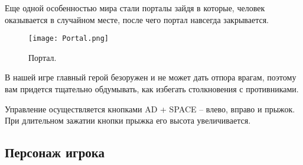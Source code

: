 \documentclass[a4paper,12pt]{article}
\begin{document}
Еще одной особенностью мира стали порталы зайдя в которые, человек оказывается в случайном месте, после чего портал навсегда закрывается.
\begin{figure}[H] %
    \centering
    \texttt{[image: Portal.png]} %
    \caption{Портал.}
    \label{fig:player_character}
\end{figure}
В нашей игре главный герой безоружен и не может дать отпора врагам, поэтому вам придется тщательно обдумывать, как избегать столкновения с противниками.

Управление осуществляется кнопками AD + SPACE – влево, вправо и прыжок. При длительном зажатии кнопки прыжка его высота увеличивается.

\subsection{Персонаж игрока}
\end{document}
